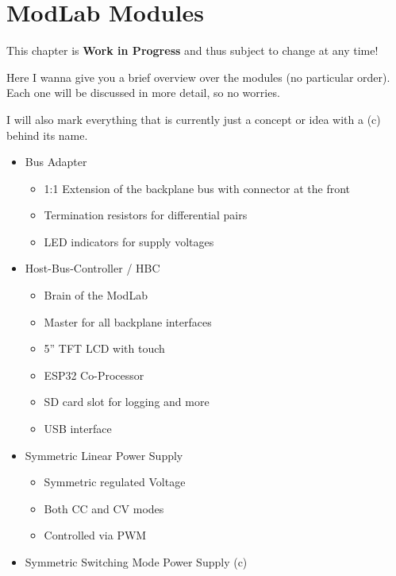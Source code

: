\chapter{ModLab Modules}
This chapter is \textbf{Work in Progress} and thus subject to change at any time!

Here I wanna give you a brief overview over the modules (no particular order). Each one will be discussed in more detail, so no worries. 

I will also mark everything that is currently just a concept or idea with a (c) behind its name. 

\begin{itemize}
	\item Bus Adapter
	\begin{itemize}
		\item 1:1 Extension of the backplane bus with connector at the front
		\item Termination resistors for differential pairs
		\item LED indicators for supply voltages
	\end{itemize}
	\item Host-Bus-Controller / HBC
	\begin{itemize}
		\item Brain of the ModLab
		\item Master for all backplane interfaces
		\item 5'' TFT LCD with touch
		\item ESP32 Co-Processor
		\item SD card slot for logging and more
		\item USB interface
	\end{itemize}
	\item Symmetric Linear Power Supply
	\begin{itemize}
		\item Symmetric regulated Voltage
		\item Both CC and CV modes
		\item Controlled via PWM
	\end{itemize}
	\item Symmetric Switching Mode Power Supply (c)

\end{itemize}
